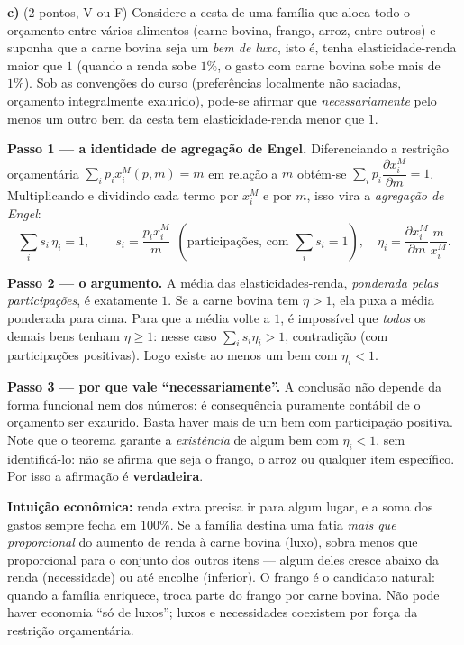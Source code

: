\textbf{c)} (2 pontos, V ou F) Considere a cesta de uma família que aloca todo o orçamento entre vários alimentos (carne bovina, frango, arroz, entre outros) e suponha que a carne bovina seja um \emph{bem de luxo}, isto é, tenha elasticidade-renda maior que $1$ (quando a renda sobe $1\%$, o gasto com carne bovina sobe mais de $1\%$). Sob as convenções do curso (preferências localmente não saciadas, orçamento integralmente exaurido), pode-se afirmar que \emph{necessariamente} pelo menos um outro bem da cesta tem elasticidade-renda menor que $1$.

\begin{solucao}
\textbf{Passo 1 --- a identidade de agregação de Engel.} Diferenciando a restrição orçamentária $\sum_i p_i x_i^{M}(p,m)=m$ em relação a $m$ obtém-se $\sum_i p_i \dfrac{\partial x_i^{M}}{\partial m}=1$. Multiplicando e dividindo cada termo por $x_i^{M}$ e por $m$, isso vira a \emph{agregação de Engel}:
\[
\sum_i s_i\,\eta_i=1,\qquad s_i=\frac{p_i x_i^{M}}{m}\ \ (\text{participações, com }\textstyle\sum_i s_i=1),\quad \eta_i=\frac{\partial x_i^{M}}{\partial m}\frac{m}{x_i^{M}}.
\]

\textbf{Passo 2 --- o argumento.} A média das elasticidades-renda, \emph{ponderada pelas participações}, é exatamente $1$. Se a carne bovina tem $\eta>1$, ela puxa a média ponderada para cima. Para que a média volte a $1$, é impossível que \emph{todos} os demais bens tenham $\eta\ge 1$: nesse caso $\sum_i s_i\eta_i>1$, contradição (com participações positivas). Logo existe ao menos um bem com $\eta_i<1$.

\textbf{Passo 3 --- por que vale ``necessariamente''.} A conclusão não depende da forma funcional nem dos números: é consequência puramente contábil de o orçamento ser exaurido. Basta haver mais de um bem com participação positiva. Note que o teorema garante a \emph{existência} de algum bem com $\eta_i<1$, sem identificá-lo: não se afirma que seja o frango, o arroz ou qualquer item específico. Por isso a afirmação é \textbf{verdadeira}.

\textbf{Intuição econômica:} renda extra precisa ir para algum lugar, e a soma dos gastos sempre fecha em $100\%$. Se a família destina uma fatia \emph{mais que proporcional} do aumento de renda à carne bovina (luxo), sobra menos que proporcional para o conjunto dos outros itens --- algum deles cresce abaixo da renda (necessidade) ou até encolhe (inferior). O frango é o candidato natural: quando a família enriquece, troca parte do frango por carne bovina. Não pode haver economia ``só de luxos''; luxos e necessidades coexistem por força da restrição orçamentária.
\end{solucao}

